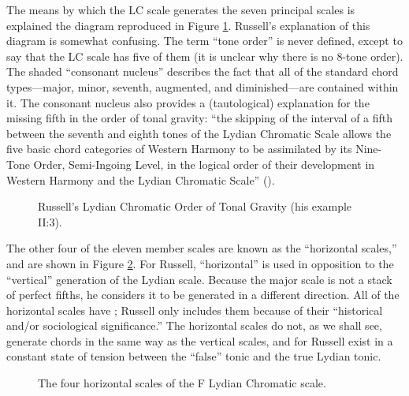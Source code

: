 The means by which the LC scale generates the seven principal scales is
explained the diagram reproduced in Figure
\ref{lcc:lc-tonal-gravity}. Russell's explanation of this diagram
is somewhat confusing. The term ``tone order'' is never defined, except to say
that the LC scale has five of them (it is unclear why there is no 8-tone
order). The shaded ``consonant nucleus'' describes the fact that all of the
standard chord types---major, minor, seventh, augmented, and diminished---are
contained within it. The consonant nucleus also provides a
(tautological) explanation for the missing fifth in the order of tonal
gravity: ``the skipping of the interval of a fifth between the seventh and
eighth tones of the Lydian Chromatic Scale allows the five basic chord
categories of Western Harmony to be assimilated by its Nine-Tone Order,
Semi-Ingoing Level, in the logical order of their development in Western
Harmony and the Lydian Chromatic Scale'' ().

\begin{figure}[tbp]
  \caption{Russell's Lydian Chromatic Order of Tonal Gravity (his example
    II:3).}
  \label{lcc:lc-tonal-gravity}
\end{figure}

The other four of the eleven member scales are known as the ``horizontal
scales,'' and are shown in Figure \ref{lcc:horizontal-scales}. For Russell,
``horizontal'' is used in opposition to the ``vertical'' generation of the
Lydian scale. Because the major scale is not a stack of perfect fifths, he
considers it to be generated in a different direction. All of the horizontal
scales have \nat{}; Russell only includes them because of their ``historical
and/or sociological significance.'' The horizontal scales do not, as we shall
see, generate chords in the same way as the vertical scales, and for Russell
exist in a constant state of tension between the ``false'' tonic and the true
Lydian tonic.

\begin{figure}[tbp]
  \caption{The four horizontal scales of the F Lydian Chromatic scale.}
  \label{lcc:horizontal-scales}
\end{figure}

